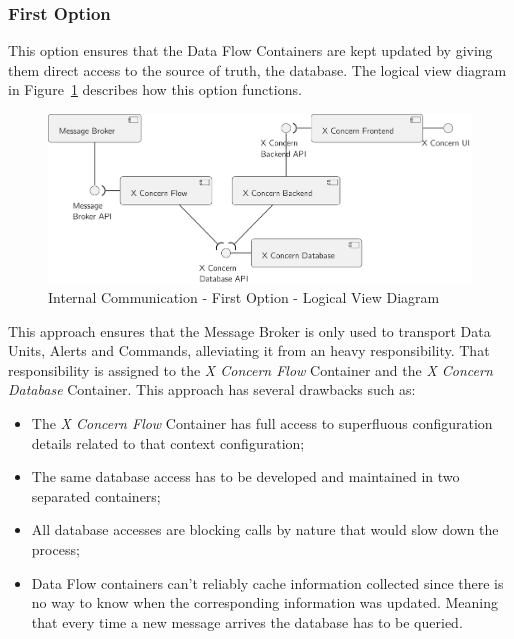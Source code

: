\subsubsection{First Option}
\label{subsubsec:design:alternatives:internal:first}

This option ensures that the Data Flow Containers are kept updated by giving them direct access to the source of truth, the database. The logical view diagram in Figure~\ref{fig:design:alternatives:internal:first:diagram} describes how this option functions.

\begin{figure}[H]
   \centering
   \includegraphics[page=1,width=0.8\columnwidth]{assets/diagrams/design/alternatives/internal/alternative1.pdf}
   \caption[Internal Communication - First Option - Logical View Diagram]{Internal Communication - First Option - Logical View Diagram}
   \label{fig:design:alternatives:internal:first:diagram}
\end{figure}

This approach ensures that the Message Broker is only used to transport Data Units, Alerts and Commands, alleviating it from an heavy responsibility.
That responsibility is assigned to the \textit{X Concern Flow} Container and the \textit{X Concern Database} Container.
This approach has several drawbacks such as:

\begin{itemize}
   \item The \textit{X Concern Flow} Container has full access to superfluous configuration details related to that context configuration;
   \item The same database access has to be developed and maintained in two separated containers;
   \item All database accesses are blocking calls by nature that would slow down the process;
   \item Data Flow containers can't reliably cache information collected since there is no way to know when the corresponding information was updated. Meaning that every time a new message arrives the database has to be queried.
\end{itemize}

